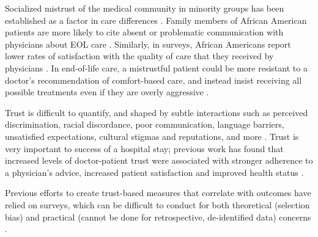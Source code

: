 \documentclass{article}
\begin{document}
Socialized mistrust of the medical community in minority groups has been established as a factor in care differences \citep{medicalapartheid}. Family members of African American patients are more likely to cite absent or problematic communication with physicians about EOL care \citep{hauser:advance-directives}. Similarly, in surveys, African Americans report lower rates of satisfaction with the quality of care that they received by physicians \citep{hanchate:minorities-cost-more}. In end-of-life care, a mistrustful patient could be more resistant to a doctor's recommendation of comfort-based care, and instead insist receiving all possible treatments even if they are overly aggressive \citep{garrett:lifesustaining,hopp:race-eol}.

Trust is difficult to quantify, and shaped by subtle interactions such as perceived discrimination, racial discordance, poor communication, language barriers, unsatisfied expectations, cultural stigmas and reputations, and more \citep{cultural-mistrust}. Trust is very important to success of a hospital stay; previous work has found that increased levels of doctor-patient trust were associated with stronger adherence to a physician's advice, increased patient satisfaction and improved health status \citep{trust-improves-outcomes}.

Previous efforts to create trust-based measures that correlate with outcomes have relied on surveys, which can be difficult to conduct for both theoretical (selection bias) and practical (cannot be done for retrospective, de-identified data) concerns \citep{lee:dying-icu}.




\end{document}
